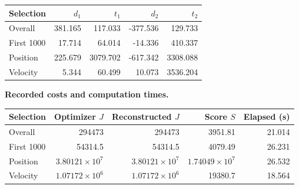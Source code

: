 \begin{center}
\begin{tabular}{lrrrr}
\toprule
Selection & $d_1$ & $t_1$ & $d_2$ & $t_2$\\
\midrule
Overall & 381.165 & 117.033 & -377.536 & 129.733\\
First 1000 & 17.714 & 64.014 & -14.336 & 410.337\\
Position & 225.679 & 3079.702 & -617.342 & 3308.088\\
Velocity & 5.344 & 60.499 & 10.073 & 3536.204\\
\bottomrule
\end{tabular}
\end{center}
\par\noindent\textbf{Recorded costs and computation times.}
\begin{center}
\begin{tabular}{lrrrr}
\toprule
Selection & Optimizer $J$ & Reconstructed $J$ & Score $S$ & Elapsed (s)\\
\midrule
Overall & 294473 & 294473 & 3951.81 & 21.014\\
First 1000 & 54314.5 & 54314.5 & 4079.49 & 26.231\\
Position & $3.80121\times10^{7}$ & $3.80121\times10^{7}$ & $1.74049\times10^{7}$ & 26.532\\
Velocity & $1.07172\times10^{6}$ & $1.07172\times10^{6}$ & 19380.7 & 18.564\\
\bottomrule
\end{tabular}
\end{center}
